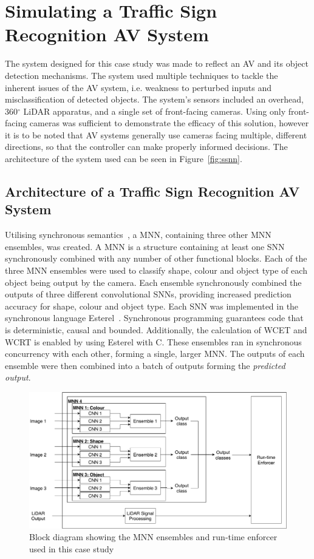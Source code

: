\section{Simulating a Traffic Sign Recognition AV System}
The system designed for this case study was made to reflect an \acf{AV} and its object detection mechanisms. 
The system used multiple techniques to tackle the inherent issues of the \ac{AV} system, i.e. weakness to perturbed inputs and misclassification of detected objects.
The system's sensors included an overhead, 360$^\circ$ \acf{LiDAR} apparatus, and a single set of front-facing cameras.
Using only front-facing cameras was sufficient to demonstrate the efficacy of this solution, however it is to be noted that \ac{AV} systems generally use cameras facing multiple, different directions, so that the controller can make properly informed decisions.
The architecture of the system used can be seen in Figure~\ref{fig:ssnn}. 

\subsection{Architecture of a Traffic Sign Recognition AV System}
Utilising synchronous semantics~\cite{benveniste2003synchronous}, a \acf{MNN}, containing three other \ac{MNN} ensembles, was created.
A \ac{MNN} is a structure containing at least one \acf{SNN} synchronously combined with any number of other functional blocks.
Each of the three \ac{MNN} ensembles were used to classify shape, colour and object type of each object being output by the camera.
Each ensemble synchronously combined the outputs of three different convolutional \acp{SNN}, providing increased prediction accuracy for shape, colour and object type. 
Each \ac{SNN} was implemented in the synchronous language Esterel~\cite{Esterel}.
Synchronous programming guarantees code that is deterministic, causal and bounded.
Additionally, the calculation of \acf{WCET} and \acf{WCRT} is enabled by using Esterel with C.
These ensembles ran in synchronous concurrency with each other, forming a single, larger \ac{MNN}. 
The outputs of each ensemble were then combined into a batch of outputs forming the \textit{predicted output}.

\begin{figure}[h]
	\centering
	\includegraphics[width=\textwidth]{Content/fig/MNN.pdf}
	\caption{Block diagram showing the \acf{MNN} ensembles and run-time enforcer used in this case study} \label{fig:mnn}
\end{figure}


